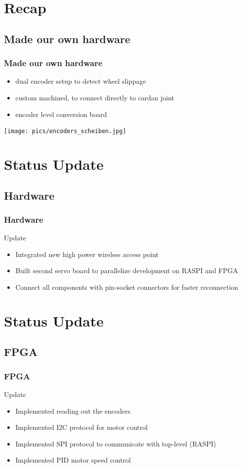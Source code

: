 \documentclass[pdf]{beamer}
\begin{document}
\section{Recap}
\subsection{Made our own hardware}
\begin{frame}
\frametitle{Made our own hardware}
\begin{itemize}
  \item dual encoder setup to detect wheel slippage
  \item custom machined, to connect directly to cardan joint 
  \item encoder level conversion board
\end{itemize}
  \begin{center}
  \texttt{[image: pics/encoders\_scheiben.jpg]}
  \end{center}
\end{frame}


\section{Status Update}
\subsection{Hardware}
\begin{frame}
\frametitle{Hardware}
\begin{exampleblock}{Update}
\begin{itemize}
  \item Integrated new high power wireless access point
  \item Built second servo board to parallelize development on RASPI and FPGA
  \item Connect all components with pin-socket connectors for faster reconnection
\end{itemize}
\end{exampleblock}
\end{frame}

\section{Status Update}
\subsection{FPGA}
\begin{frame}
\frametitle{FPGA}
\begin{exampleblock}{Update}
\begin{itemize}
  \item Implemented reading out the encoders
  \item Implemented I2C protocol for motor control
  \item Implemented SPI protocol to communicate with top-level (RASPI)
  \item Implemented PID motor speed control
\end{itemize}
\end{exampleblock}
\end{frame}
\end{document}
